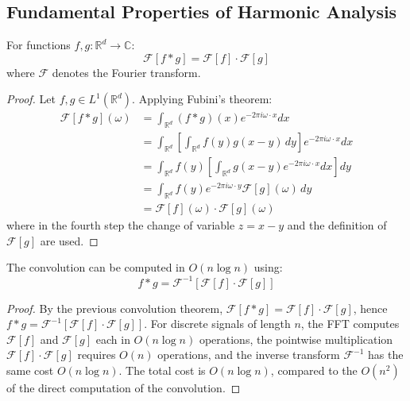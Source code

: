 \subsection{Fundamental Properties of Harmonic Analysis}\label{subsec:propiedades_fundamentales}

\begin{theorem}\label{thm:convolucion_fourier}
For functions \(f, g: \mathbb{R}^d \to \mathbb{C}\):
\[
\mathcal{F}[f * g] = \mathcal{F}[f] \cdot \mathcal{F}[g]
\]
where \(\mathcal{F}\) denotes the Fourier transform.
\end{theorem}

\begin{proof}
Let $f, g \in L^1(\mathbb{R}^d)$. Applying Fubini's theorem:
\begin{align}
\mathcal{F}[f * g](\omega) &= \int_{\mathbb{R}^d} (f * g)(x) e^{-2\pi i\omega \cdot x} dx \\
&= \int_{\mathbb{R}^d} \left[\int_{\mathbb{R}^d} f(y)g(x-y) \, dy\right] e^{-2\pi i\omega \cdot x} dx \\
&= \int_{\mathbb{R}^d} f(y) \left[\int_{\mathbb{R}^d} g(x-y) e^{-2\pi i\omega \cdot x} dx\right] dy \\
&= \int_{\mathbb{R}^d} f(y) e^{-2\pi i\omega \cdot y} \mathcal{F}[g](\omega) \, dy \\
&= \mathcal{F}[f](\omega) \cdot \mathcal{F}[g](\omega)
\end{align}
where in the fourth step the change of variable $z = x - y$ and the definition of $\mathcal{F}[g]$ are used.
\end{proof}

\begin{corollary}
The convolution can be computed in \(O(n \log n)\) using:
\[
f * g = \mathcal{F}^{-1}[\mathcal{F}[f] \cdot \mathcal{F}[g]]
\]
\end{corollary}

\begin{proof}
By the previous convolution theorem, $\mathcal{F}[f * g] = \mathcal{F}[f] \cdot \mathcal{F}[g]$, hence $f * g = \mathcal{F}^{-1}[\mathcal{F}[f] \cdot \mathcal{F}[g]]$. For discrete signals of length $n$, the \gls{FFT} computes $\mathcal{F}[f]$ and $\mathcal{F}[g]$ each in $O(n \log n)$ operations, the pointwise multiplication $\mathcal{F}[f] \cdot \mathcal{F}[g]$ requires $O(n)$ operations, and the inverse transform $\mathcal{F}^{-1}$ has the same cost $O(n \log n)$. The total cost is $O(n \log n)$, compared to the $O(n^2)$ of the direct computation of the convolution.
\end{proof}

